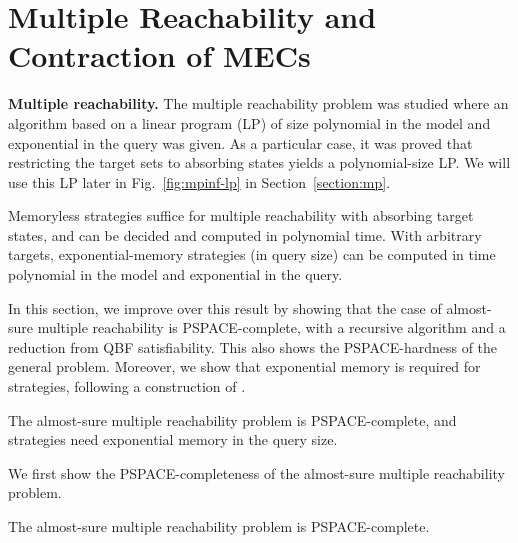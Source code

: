 \documentclass{llncs}
\newcommand\PSPACE{\textrm{\sf PSPACE}}
\begin{document}
\section{Multiple Reachability and Contraction of MECs}
\label{section:reachsafe}

\smallskip\noindent\textbf{Multiple reachability.} The multiple reachability  problem
was studied \cite{EKVY-lmcs08} where an algorithm based on a linear program (LP) of size polynomial in the model and exponential in the query was given.
As a particular case, it was proved that restricting the target sets to absorbing states yields a polynomial-size LP. We will use this LP later in Fig.~\ref{fig:mpinf-lp} in Section~\ref{section:mp}.


\begin{theorem}
  \label{thm:absorbing-reachsafe}
  Memoryless strategies suffice for multiple reachability with absorbing target states, and
  can be decided and computed in polynomial time.
  With arbitrary targets, exponential-memory strategies (in query size) can be computed in time polynomial in the model and exponential in the query.
\end{theorem}


In this section, we improve over this result by showing that the case of almost-sure multiple reachability is \PSPACE-complete,
with a recursive algorithm and a reduction from QBF satisfiability.
This also shows the \PSPACE-hardness of the general problem. Moreover, we show that exponential memory is required for strategies,
following a construction of \cite{DBLP:journals/acta/ChatterjeeRR14}.

\begin{theorem}
  \label{thm:asreach}
  The almost-sure multiple reachability problem is \PSPACE-complete,
  and strategies need exponential memory in the query size.
\end{theorem}

We first show the \PSPACE-completeness of the almost-sure multiple reachability problem.

\begin{lemma}
  The almost-sure multiple reachability problem is \PSPACE-complete.
\end{lemma}
\end{document}
